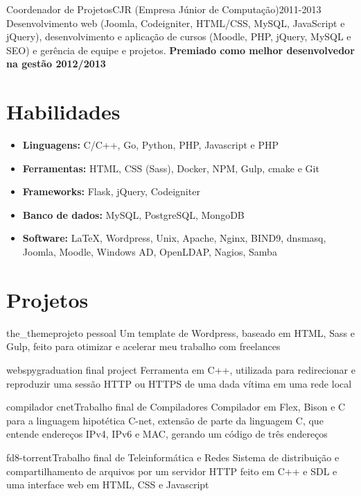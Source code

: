 \documentclass{cv}
\begin{document}
  \begin{chronoitem}
    {Coordenador de Projetos}{CJR (Empresa Júnior de Computação)}{2011-2013}
    Desenvolvimento web (Joomla, Codeigniter, HTML/CSS, MySQL, JavaScript e jQuery), desenvolvimento e aplicação de cursos (Moodle, PHP, jQuery, MySQL e SEO) e gerência de equipe e projetos.  
    \textbf{Premiado como melhor desenvolvedor na gestão 2012/2013}
  \end{chronoitem}
  \vspace{-.5cm}

  \section{Habilidades}
  \begin{itemize}
    \item[] \textbf{Linguagens:} C/C++, Go, Python, PHP, Javascript e PHP
    \item[] \textbf{Ferramentas:} HTML, CSS (Sass), Docker, NPM, Gulp, cmake e Git
    \item[] \textbf{Frameworks:} Flask, jQuery, Codeigniter
    \item[] \textbf{Banco de dados:} MySQL, PostgreSQL, MongoDB
    \item[] \textbf{Software:} \LaTeX, Wordpress, Unix, Apache, Nginx, BIND9, dnsmasq, Joomla, Moodle, Windows AD, OpenLDAP, Nagios, Samba
  \end{itemize}

  \section{Projetos}
  \begin{chronoitem}{the\_theme}{projeto pessoal}{}
    Um template de Wordpress, baseado em HTML, Sass e Gulp, feito para otimizar e acelerar meu trabalho com freelances
  \end{chronoitem}

  \begin{chronoitem}{webspy}{graduation final project}{}
    Ferramenta em C++, utilizada para redirecionar e reproduzir uma sessão HTTP ou HTTPS de uma dada vítima em uma rede local
  \end{chronoitem}

  \begin{chronoitem}{compilador cnet}{Trabalho final de Compiladores}{}
    Compilador em Flex, Bison e C para a linguagem hipotética C-net, extensão de parte da linguagem C, que entende endereços IPv4, IPv6 e MAC, gerando um código de três endereços
  \end{chronoitem}

  \begin{chronoitem}{fd8-torrent}{Trabalho final de Teleinformática e Redes}{}
    Sistema de distribuição e compartilhamento de arquivos por um servidor HTTP feito em C++ e SDL e uma interface web em HTML, CSS e Javascript
  \end{chronoitem}
\end{document}
